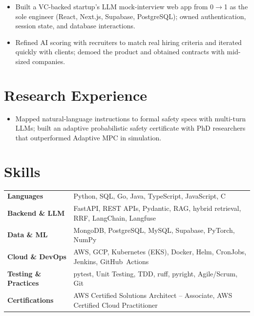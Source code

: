 \documentclass[11pt, letterpaper]{article}
\begin{document}
\begin{itemize}
  \item Built a VC-backed startup's LLM mock-interview web app from 0$\rightarrow$1 as the sole engineer (React, Next.js, Supabase, PostgreSQL); owned authentication, session state, and database interactions.
  \item Refined AI scoring with recruiters to match real hiring criteria and iterated quickly with clients; demoed the product and obtained contracts with mid-sized companies.
\end{itemize}

\section{Research Experience}
\begin{itemize}
  \item Mapped natural-language instructions to formal safety specs with multi-turn LLMs; built an adaptive probabilistic safety certificate with PhD researchers that outperformed Adaptive MPC in simulation.
\end{itemize}

\section{Skills}
\begin{tabularx}{\textwidth}{@{}l @{\hspace{7pt}} >{\raggedright\arraybackslash}X@{}}
  \textbf{Languages} & Python, SQL, Go, Java, TypeScript, JavaScript, C \\[1pt]
  \textbf{Backend \& LLM} & FastAPI, REST APIs, Pydantic, RAG, hybrid retrieval, RRF, LangChain, Langfuse \\[1pt]
  \textbf{Data \& ML} & MongoDB, PostgreSQL, MySQL, Supabase, PyTorch, NumPy \\[1pt]
  \textbf{Cloud \& DevOps} & AWS, GCP, Kubernetes (EKS), Docker, Helm, CronJobs, Jenkins, GitHub~Actions \\[1pt]
  \textbf{Testing \& Practices} & pytest, Unit Testing, TDD, ruff, pyright, Agile/Scrum, Git \\[1pt]
  \textbf{Certifications} & AWS Certified Solutions Architect -- Associate, AWS Certified Cloud Practitioner \\
\end{tabularx}
\end{document}

